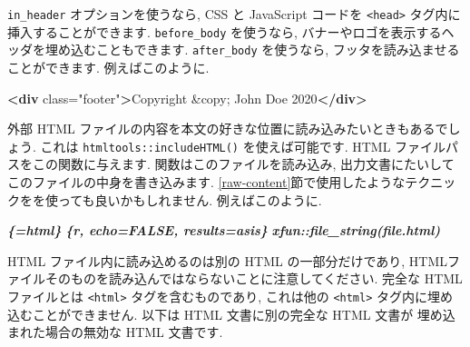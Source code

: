 \documentclass[
  11pt,
  lualatex,
  ja=standard]{bxjsreport}
\newenvironment{Shaded}{\begin{snugshade}}{\end{snugshade}}
\newcommand{\DecValTok}[1]{\textcolor[rgb]{0.00,0.00,0.81}{#1}}
\newcommand{\InformationTok}[1]{\textcolor[rgb]{0.56,0.35,0.01}{\textbf{\textit{#1}}}}
\newcommand{\KeywordTok}[1]{\textcolor[rgb]{0.13,0.29,0.53}{\textbf{#1}}}
\newcommand{\NormalTok}[1]{#1}
\newcommand{\OtherTok}[1]{\textcolor[rgb]{0.56,0.35,0.01}{#1}}
\newcommand{\StringTok}[1]{\textcolor[rgb]{0.31,0.60,0.02}{#1}}
\begin{document}
\texttt{in\_header} オプションを使うなら, CSS と JavaScript コードを \texttt{\textless{}head\textgreater{}} タグ内に挿入することができます. \texttt{before\_body} を使うなら, バナーやロゴを表示するヘッダを埋め込むこともできます. \texttt{after\_body} を使うなら, フッタを読み込ませることができます. 例えばこのように.

\begin{Shaded}
\begin{Highlighting}[]
\KeywordTok{\textless{}div}\OtherTok{ class=}\StringTok{"footer"}\KeywordTok{\textgreater{}}\NormalTok{Copyright }\DecValTok{\&copy;}\NormalTok{ John Doe 2020}\KeywordTok{\textless{}/div\textgreater{}}
\end{Highlighting}
\end{Shaded}

外部 HTML ファイルの内容を本文の好きな位置に読み込みたいときもあるでしょう. これは \texttt{htmltools::includeHTML()} を使えば可能です. HTML ファイルパスをこの関数に与えます. 関数はこのファイルを読み込み, 出力文書にたいしてこのファイルの中身を書き込みます. \ref{raw-content}節で使用したようなテクニックをを使っても良いかもしれません. 例えばこのように.

\begin{Shaded}
\begin{Highlighting}[]
\InformationTok{\textasciigrave{}\textasciigrave{}\textasciigrave{}\textasciigrave{}\{=html\}}
\InformationTok{\textasciigrave{}\textasciigrave{}\textasciigrave{}\{r, echo=FALSE, results=\textquotesingle{}asis\textquotesingle{}\}}
\InformationTok{xfun::file\_string(\textquotesingle{}file.html\textquotesingle{})}
\InformationTok{\textasciigrave{}\textasciigrave{}\textasciigrave{}}
\InformationTok{\textasciigrave{}\textasciigrave{}\textasciigrave{}\textasciigrave{}}
\end{Highlighting}
\end{Shaded}

HTML ファイル内に読み込めるのは別の HTML の一部分だけであり, HTMLファイルそのものを読み込んではならないことに注意してください. 完全な HTML ファイルとは \texttt{\textless{}html\textgreater{}} タグを含むものであり, これは他の \texttt{\textless{}html\textgreater{}} タグ内に埋め込むことができません. 以下は HTML 文書に別の完全な HTML 文書が 埋め込まれた場合の無効な HTML 文書です.
\end{document}
